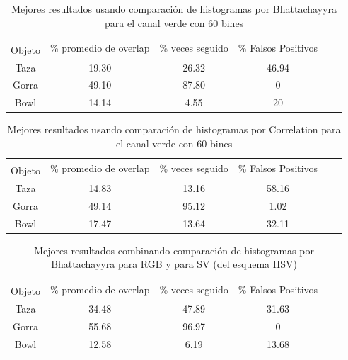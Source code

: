 \begin{table}[h]
	\begin{tabular}{|c|c|c|c|c|c|}
	    \hline
	    & \multirow{2}{2.4cm}{\% promedio de overlap} & \multirow{2}{2cm}{\% veces seguido} & \multirow{2}{1.6cm}{\% Falsos Positivos}\\
		Objeto & & &\\
	    \hline
	    Taza   & 19.30      & 26.32             & 46.94 \\
	    \hline
	    Gorra  & 49.10      & 87.80             & 0     \\
	    \hline
	    Bowl   & 14.14      &  4.55             & 20    \\
	    \hline
    \end{tabular}
	\caption{Mejores resultados usando comparación de histogramas por Bhattachayyra para el canal verde con 60 bines}
	\label{pruebas_definitivas_bhatta_green}
\end{table}

\begin{table}[h]
	\begin{tabular}{|c|c|c|c|c|c|}
	    \hline
	    & \multirow{2}{2.4cm}{\% promedio de overlap} & \multirow{2}{2cm}{\% veces seguido} & \multirow{2}{1.6cm}{\% Falsos Positivos}\\
		Objeto & & &\\
	    \hline
	    Taza   & 14.83      & 13.16             & 58.16 \\
	    \hline
	    Gorra  & 49.14      & 95.12             & 1.02  \\
	    \hline
	    Bowl   & 17.47      & 13.64             & 32.11 \\
	    \hline
    \end{tabular}
	\caption{Mejores resultados usando comparación de histogramas por Correlation para el canal verde con 60 bines}
	\label{pruebas_definitivas_correl_green}
\end{table}

\begin{table}[h]
	\begin{tabular}{|c|c|c|c|c|c|}
	    \hline
	    & \multirow{2}{2.4cm}{\% promedio de overlap} & \multirow{2}{2cm}{\% veces seguido} & \multirow{2}{1.6cm}{\% Falsos Positivos}\\
		Objeto & & &\\
	    \hline
	    Taza   & 34.48      & 47.89             & 31.63  \\
	    \hline
	    Gorra  & 55.68      & 96.97             & 0      \\
	    \hline
	    Bowl   & 12.58      &  6.19             & 13.68  \\
	    \hline
    \end{tabular}
	\caption{Mejores resultados combinando comparación de histogramas por Bhattachayyra para RGB y para SV (del esquema HSV)}
	\label{pruebas_definitivas_rgb_sv}
\end{table}



